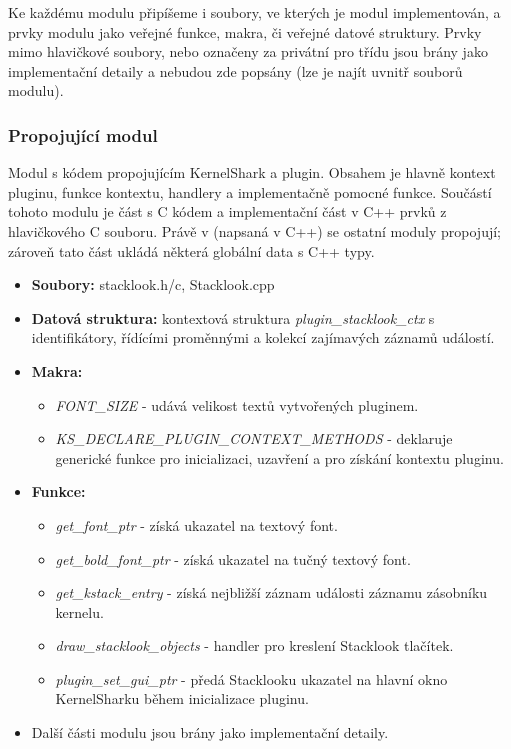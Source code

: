 Ke každému modulu připíšeme i soubory, ve kterých je modul implementován, a prvky modulu jako veřejné funkce, makra, či veřejné datové struktury. Prvky mimo hlavičkové soubory, nebo označeny za privátní pro třídu jsou brány jako implementační detaily a nebudou zde popsány (lze je najít uvnitř souborů modulu).

\subsubsection*{Propojující modul}
Modul s kódem propojujícím KernelShark a plugin. Obsahem je hlavně kontext pluginu, funkce kontextu, handlery a implementačně pomocné funkce. Součástí tohoto modulu je část s C kódem a implementační část v C++ prvků z hlavičkového C souboru. Právě v  (napsaná v C++) se ostatní moduly propojují; zároveň tato část ukládá některá globální data s C++ typy.

\begin{itemize}
  \item \textbf{Soubory:} stacklook.h/c, Stacklook.cpp
  \item \textbf{Datová struktura:} kontextová struktura \emph{plugin\_stacklook\_ctx} s identifikátory, řídícími proměnnými a kolekcí zajímavých záznamů událostí.
  \item \textbf{Makra:}
  \begin{itemize}
    \item \emph{FONT\_SIZE} - udává velikost textů vytvořených pluginem.
    \item \emph{KS\_DECLARE\_PLUGIN\_CONTEXT\_METHODS} - deklaruje generické funkce pro inicializaci, uzavření a pro získání kontextu pluginu.
  \end{itemize}
  \item \textbf{Funkce:}
  \begin{itemize}
    \item \emph{get\_font\_ptr} - získá ukazatel na textový font.
    \item \emph{get\_bold\_font\_ptr} - získá ukazatel na tučný textový font.
    \item \emph{get\_kstack\_entry} - získá nejbližší záznam události záznamu zásobníku kernelu.
    \item \emph{draw\_stacklook\_objects} - handler pro kreslení Stacklook tlačítek.
    \item \emph{plugin\_set\_gui\_ptr} - předá Stacklooku ukazatel na hlavní okno KernelSharku během inicializace pluginu.
  \end{itemize}
  \item Další části modulu jsou brány jako implementační detaily.
\end{itemize}


